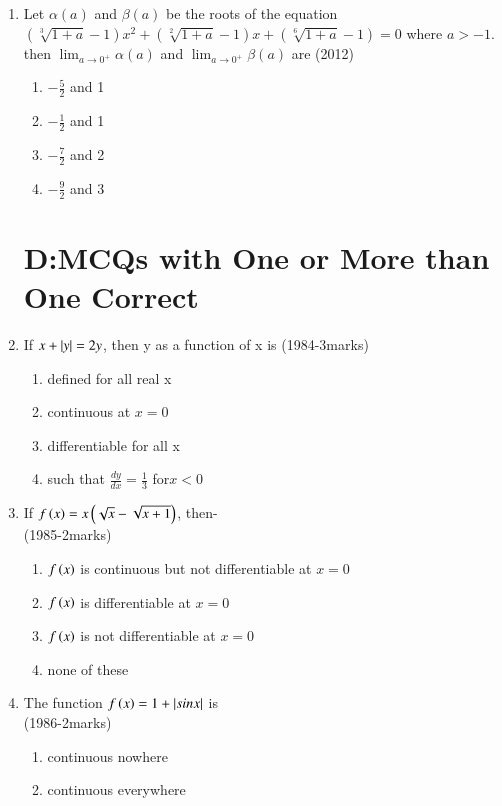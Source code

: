 \documentclass[journal]{IEEEtran}
\numberwithin{equation}{enumi}
\numberwithin{figure}{enumi}
\begin{document}
\begin{enumerate}
\begin{enumerate}
		\end{enumerate}
	\item Let $\alpha(a)$ and $\beta(a)$ be the roots of the equation $(\sqrt[3]{1+a}-1)x^2+(\sqrt[2]{1+a}-1)x+(\sqrt[6]{1+a}-1)=0$ where $a>-1$. then $\lim_{a \to 0^+}{\alpha(a)}$ and $\lim_{a \to 0^+}{\beta(a)}$ are \hfill{(2012)}
		\begin{enumerate}
			\item $-\frac{5}{2}$ and 1
			\item $-\frac{1}{2}$ and 1
			\item $-\frac{7}{2}$ and 2
			\item $-\frac{9}{2}$ and 3 \\
		\end{enumerate}
\section{D:MCQs with One or More than One Correct}
	\item If $x+\left\vert y\right\vert=2y$, then y as a function of x is \hfill{(1984-3marks)}
		\begin{enumerate}
			\item defined for all real x
			\item continuous at $x=0$
			\item differentiable for all x
			\item such that $\frac{dy}{dx}=\frac{1}{3}$ for$x<0$ \\
		\end{enumerate}
	\item If $f\left(x\right)=x\left(\sqrt{x}-\sqrt{x+1}\right)$, then- \\ \hfill{(1985-2marks)}
		\begin{enumerate}
			\item $f\left(x\right)$ is continuous but not differentiable at $x=0$
			\item $f\left(x\right)$ is differentiable at $x=0$
			\item $f\left(x\right)$ is not differentiable at $x=0$
			\item none of these \\
		\end{enumerate}
	\item The function $f\left(x\right)=1+\left\vert sinx\right\vert$ is \\ \hfill{(1986-2marks)}
		\begin{enumerate}
			\item continuous nowhere
			\item continuous everywhere

\end{enumerate}
\end{enumerate}
\end{document}
